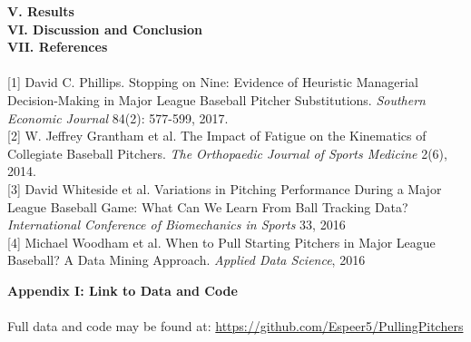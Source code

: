 \documentclass[12 pt]{article}
\begin{document}
\textbf{V. Results} \\

\textbf{VI. Discussion and Conclusion} \\

\pagebreak
\textbf{VII. References} \\
\\
\hypertarget{1}{[1]} David C. Phillips. Stopping on Nine: Evidence of Heuristic 
Managerial Decision-Making in Major League Baseball Pitcher Substitutions.
\emph{Southern Economic Journal} 84(2): 577-599, 2017.
\\
\hypertarget{2}{[2]} W. Jeffrey Grantham et al. The Impact of Fatigue on the Kinematics 
of Collegiate Baseball Pitchers. \emph{The Orthopaedic Journal of Sports Medicine}
2(6), 2014.
\\
\hypertarget{3}{[3]} David Whiteside et al. Variations in Pitching Performance During a 
Major League Baseball Game: What Can We Learn From Ball Tracking Data? 
\emph{International Conference of Biomechanics in Sports} 33, 2016
\\
\hypertarget{4}{[4]} Michael Woodham et al. When to Pull Starting Pitchers in Major League Baseball? A Data Mining Approach.
\emph{Applied Data Science}, 2016


\pagebreak
\textbf{Appendix I: Link to Data and Code} \\
\\
Full data and code may be found at: \url{https://github.com/Espeer5/PullingPitchers}
\end{document}
